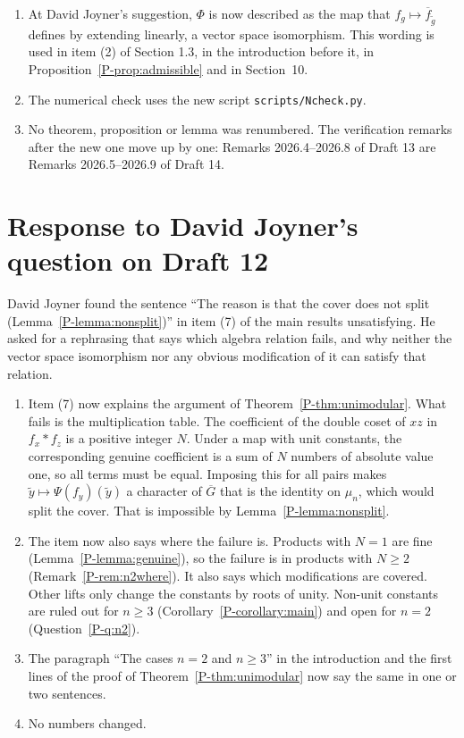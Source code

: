 \documentclass[12pt,letterpaper]{amsart}
\newcommand{\fbar}{\overline{f}}
\begin{document}
\begin{enumerate}[leftmargin=1.5em]
proposition appeared among the main results.
\item At David Joyner's suggestion, $\Phi$ is now described as the map
that $f_g\mapsto\fbar_{\tilde g}$ defines by extending linearly, a
vector space isomorphism. This wording is used in item (2) of
Section 1.3, in the introduction before it, in
Proposition~\ref{P-prop:admissible} and in Section~10.
\item The numerical check uses the new script
\texttt{scripts/Ncheck.py}.
\item No theorem, proposition or lemma was renumbered. The verification
remarks after the new one move up by one: Remarks 2026.4--2026.8 of
Draft 13 are Remarks 2026.5--2026.9 of Draft 14.
\end{enumerate}

\section{Response to David Joyner's question on Draft 12}
\label{sec:d12request}

David Joyner found the sentence ``The reason is that the cover does not
split (Lemma~\ref{P-lemma:nonsplit})'' in item (7) of the main results
unsatisfying. He asked for a rephrasing that says which algebra relation
fails, and why neither the vector space isomorphism nor any obvious
modification of it can satisfy that relation.

\begin{enumerate}[leftmargin=1.5em]
\item Item (7) now explains the argument of
Theorem~\ref{P-thm:unimodular}. What fails is the multiplication table.
The coefficient of the double coset of $xz$ in $f_x*f_z$ is a positive
integer $N$. Under a map with unit constants, the corresponding genuine
coefficient is a sum of $N$ numbers of absolute value one, so all
terms must be equal. Imposing this for all pairs makes
$\tilde y\mapsto\Psi(f_y)(\tilde y)$ a character of $\overline G$ that
is the identity on $\mu_n$, which would split the cover. That is
impossible by Lemma~\ref{P-lemma:nonsplit}.
\item The item now also says where the failure is. Products with $N=1$
are fine (Lemma~\ref{P-lemma:genuine}), so the failure is in products
with $N\geq2$ (Remark~\ref{P-rem:n2where}). It also says which
modifications are covered. Other lifts only change the constants by
roots of unity. Non-unit constants are ruled out for $n\geq3$
(Corollary~\ref{P-corollary:main}) and open for $n=2$
(Question~\ref{P-q:n2}).
\item The paragraph ``The cases $n=2$ and $n\geq3$'' in the
introduction and the first lines of the proof of
Theorem~\ref{P-thm:unimodular} now say the same in one or two sentences.
\item No numbers changed.
\end{enumerate}
\end{document}
